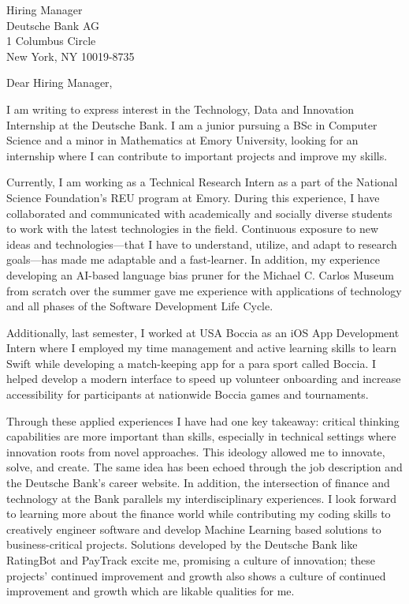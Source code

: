 \documentclass[letterpaper,12pt]{letter}
\date{}
\begin{document}
\begin{letter}{%
    Hiring Manager \\ 
	Deutsche Bank AG \\
	1 Columbus Circle \\
	New York, NY 10019-8735
}

\opening{Dear Hiring Manager,}

I am writing to express interest in the Technology, Data and Innovation Internship at the Deutsche Bank. I am a junior pursuing 
a BSc in Computer Science and a minor in Mathematics at Emory University, looking for an internship where I can 
contribute to important projects and improve my skills.

Currently, I am working as a Technical Research Intern as a part of the National Science Foundation's 
REU program at Emory. During this experience, I have  
collaborated and communicated with academically and socially diverse students to work with the latest technologies in the field.
Continuous exposure to new ideas and technologies—that I have to understand, 
utilize, and adapt to research goals—has made me adaptable and a fast-learner. 
In addition, my experience developing an AI-based language bias pruner for the
Michael C. Carlos Museum from scratch over the summer gave me experience with 
applications of technology and all phases of the Software Development Life Cycle.


Additionally, last semester, I worked at USA Boccia as an iOS App Development Intern 
where I employed my time management and active learning 
skills to learn Swift while developing a match-keeping app for a para sport 
called Boccia. I helped 
develop a modern interface to speed up volunteer onboarding and increase
accessibility for participants at nationwide Boccia games and tournaments.

Through these applied experiences I have had one key takeaway: critical thinking 
capabilities are more important than skills, especially in technical
settings where innovation roots from novel approaches. This ideology allowed me to 
innovate, solve, and create. The same idea has been echoed through the job 
description and the Deutsche Bank's career website. In addition, the intersection 
of finance and technology at the Bank parallels my interdisciplinary experiences.
I look forward to learning more about the finance world while contributing my coding
skills to creatively engineer software and develop Machine Learning based solutions
to business-critical projects. Solutions developed by the Deutsche Bank 
like RatingBot and PayTrack excite me, promising a culture of innovation; these
projects' continued improvement and growth also shows a culture of continued 
improvement and growth which are likable qualities for me. 


\end{letter}
\end{document}
